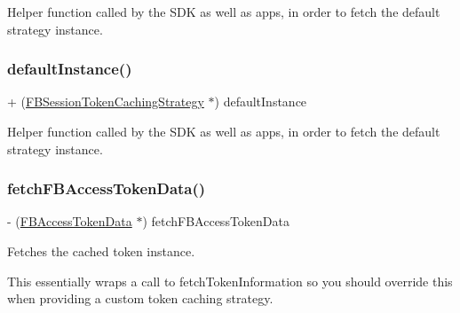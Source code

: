 Helper function called by the S\+DK as well as apps, in order to fetch the default strategy instance. \mbox{\label{interfaceFBSessionTokenCachingStrategy_a293d422412b33d069fef99f651b74b87}} 
\subsubsection{\texorpdfstring{default\+Instance()}{defaultInstance()}\hspace{0.1cm}{\footnotesize\ttfamily [5/5]}}
{\footnotesize\ttfamily + (\hyperlink{interfaceFBSessionTokenCachingStrategy}{F\+B\+Session\+Token\+Caching\+Strategy} $\ast$) default\+Instance \begin{DoxyParamCaption}{ }\end{DoxyParamCaption}}

Helper function called by the S\+DK as well as apps, in order to fetch the default strategy instance. \mbox{\label{interfaceFBSessionTokenCachingStrategy_a7378a3d9006864d343e086bbfbe66948}} 
\subsubsection{\texorpdfstring{fetch\+F\+B\+Access\+Token\+Data()}{fetchFBAccessTokenData()}\hspace{0.1cm}{\footnotesize\ttfamily [1/5]}}
{\footnotesize\ttfamily -\/ (\hyperlink{interfaceFBAccessTokenData}{F\+B\+Access\+Token\+Data} $\ast$) fetch\+F\+B\+Access\+Token\+Data \begin{DoxyParamCaption}{ }\end{DoxyParamCaption}}

Fetches the cached token instance.

This essentially wraps a call to {\ttfamily fetch\+Token\+Information} so you should override this when providing a custom token caching strategy.

